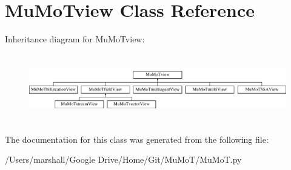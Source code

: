 \hypertarget{class_mu_mo_t_1_1_mu_mo_tview}{}\section{Mu\+Mo\+Tview Class Reference}
\label{class_mu_mo_t_1_1_mu_mo_tview}
Inheritance diagram for Mu\+Mo\+Tview\+:\begin{figure}[H]
\begin{center}
\leavevmode
\includegraphics[height=3.000000cm]{class_mu_mo_t_1_1_mu_mo_tview}
\end{center}
\end{figure}


The documentation for this class was generated from the following file\+:\begin{DoxyCompactItemize}
\item 
/\+Users/marshall/\+Google Drive/\+Home/\+Git/\+Mu\+Mo\+T/Mu\+Mo\+T.\+py\end{DoxyCompactItemize}
